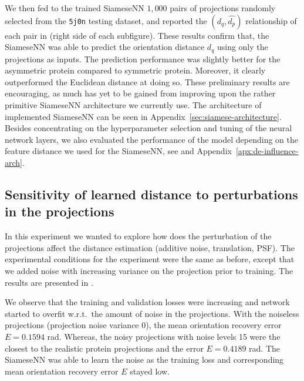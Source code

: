 We then fed to the trained SiameseNN $1,000$ pairs of projections randomly selected from the \texttt{5j0n} testing dataset, and reported the $(d_q,\widehat{d_p})$ relationship of each pair in  (right side of each subfigure).
These results confirm that, the SiameseNN was able to predict the orientation distance $d_q$ using only the projections as inputs. 
The prediction performance was slightly better for the asymmetric protein compared to symmetric protein.
Moreover, it clearly outperformed the Euclidean distance at doing so.
These preliminary results are encouraging, as much has yet to be gained from improving upon the rather primitive SiameseNN architecture we currently use. 
The architecture of implemented SiameseNN can be seen in Appendix~\ref{sec:siamese-architecture}. 
Besides concentrating on the hyperparameter selection and tuning of the neural network layers, we also evaluated the performance of the model depending on the feature distance we used for the SiameseNN, see and Appendix~\ref{apx:de-influence-arch}.


\subsection{Sensitivity of learned distance to perturbations in the projections}\label{sec:results:distance-estimation:sensitivity}


In this experiment we wanted to explore how does the perturbation of the projections affect the distance estimation (additive noise, translation, PSF). 
The experimental conditions for the experiment were the same as before, except that we added noise with increasing variance on the projection prior to training.
The results are presented in .

We observe that the training and validation losses were increasing and network started to overfit w.r.t.\ the amount of noise in the projections.
With the noiseless projections (projection noise variance 0), the mean orientation recovery error $E = 0.1594$ rad.
Whereas, the noisy projections with noise levels 15 were the closest to the realistic protein projections and the error $E=0.4189$ rad.
The SiameseNN was able to learn the noise as the training loss and corresponding mean orientation recovery error $E$ stayed low.

